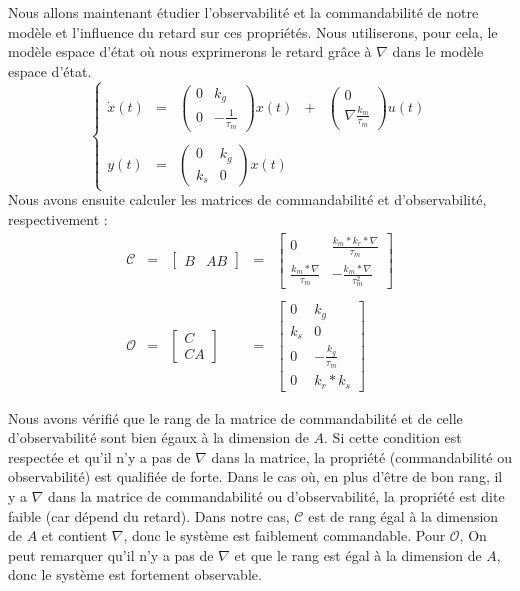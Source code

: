 Nous allons maintenant étudier l'observabilité et la commandabilité de notre modèle et l'influence du retard sur ces propriétés. Nous utiliserons, pour cela, le modèle espace d'état où nous exprimerons le retard grâce à $\nabla$ dans le modèle espace d'état. 
\begin{equation}
\left\lbrace
\begin{array}{lclcl}
\dot{x}(t) 
&=&
\begin{pmatrix}
0 & k_g\\
0 & -\frac{1}{\tau_m} 
\end{pmatrix}
x(t)
&+&
\begin{pmatrix}
0 \\
\nabla \frac{k_m}{\tau_m}
\end{pmatrix}
u(t)\\
&&&&\\
y(t)
&=&
\begin{pmatrix}
0	&	k_g\\
k_s 	&	0
\end{pmatrix}
x(t) 
&&
\end{array}\right.
\end{equation}
Nous avons ensuite calculer les matrices de commandabilité et d'observabilité, respectivement :
\begin{equation}
\begin{array}{lclcl}
\mathcal{C} &=& \begin{bmatrix}
B & AB 
\end{bmatrix}
&=&
\begin{bmatrix}
0 	&	\frac{k_m*k_r*\nabla}{\tau_m}  \\
\frac{k_m*\nabla}{\tau_m}	& -\frac{k_m*\nabla}{\tau_m^2}
\end{bmatrix}
\\
&&&&\\

\mathcal{O} &=& \begin{bmatrix}
C \\
CA 
\end{bmatrix}
&=&
\begin{bmatrix}
0	&	k_g\\
k_s &	0\\
0	& -\frac{k_g}{\tau_m}\\
0	&    k_r*k_s
\end{bmatrix}
\end{array}
\end{equation}

Nous avons vérifié que le rang de la matrice de commandabilité et de celle d'observabilité sont bien égaux à la dimension de $A$. Si cette condition est respectée et qu'il n'y a pas de $\nabla$ dans la matrice, la propriété (commandabilité ou observabilité) est qualifiée de forte. Dans le cas où, en plus d'être de bon rang, il y a $\nabla$ dans la matrice de commandabilité ou d'observabilité, la propriété est dite faible (car dépend du retard). Dans notre cas, $\mathcal{C}$ est de rang égal à la dimension de $A$ et contient $\nabla$, donc le système est faiblement commandable. Pour $\mathcal{O}$, On peut remarquer qu'il n'y a pas de $\nabla$ et que le rang est égal à la dimension de $A$, donc le système est fortement observable.



